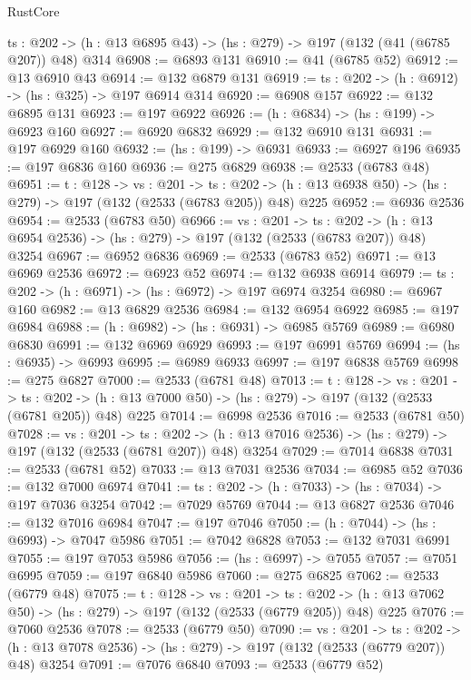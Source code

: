 \begin{lexlean}{RustCore}
\begin{coremodule}
  {ts : @202} -> (h : @13 @6895 @43) -> (hs : @279) -> @197 (@132 (@41 (@6785 @207)) @48) @314
@6908 := @6893 @131
@6910 := @41 (@6785 @52)
@6912 := @13 @6910 @43
@6914 := @132 @6879 @131
@6919 := {ts : @202} -> (h : @6912) -> (hs : @325) -> @197 @6914 @314
@6920 := @6908 @157
@6922 := @132 @6895 @131
@6923 := @197 @6922
@6926 := (h : @6834) -> (hs : @199) -> @6923 @160
@6927 := @6920 @6832
@6929 := @132 @6910 @131
@6931 := @197 @6929 @160
@6932 := (hs : @199) -> @6931
@6933 := @6927 @196
@6935 := @197 @6836 @160
@6936 := @275 @6829
@6938 := @2533 (@6783 @48)
@6951 := {t : @128} ->
  {vs : @201} ->
  {ts : @202} -> (h : @13 @6938 @50) -> (hs : @279) -> @197 (@132 (@2533 (@6783 @205)) @48) @225
@6952 := @6936 @2536
@6954 := @2533 (@6783 @50)
@6966 := {vs : @201} ->
  {ts : @202} -> (h : @13 @6954 @2536) -> (hs : @279) -> @197 (@132 (@2533 (@6783 @207)) @48) @3254
@6967 := @6952 @6836
@6969 := @2533 (@6783 @52)
@6971 := @13 @6969 @2536
@6972 := @6923 @52
@6974 := @132 @6938 @6914
@6979 := {ts : @202} -> (h : @6971) -> (hs : @6972) -> @197 @6974 @3254
@6980 := @6967 @160
@6982 := @13 @6829 @2536
@6984 := @132 @6954 @6922
@6985 := @197 @6984
@6988 := (h : @6982) -> (hs : @6931) -> @6985 @5769
@6989 := @6980 @6830
@6991 := @132 @6969 @6929
@6993 := @197 @6991 @5769
@6994 := (hs : @6935) -> @6993
@6995 := @6989 @6933
@6997 := @197 @6838 @5769
@6998 := @275 @6827
@7000 := @2533 (@6781 @48)
@7013 := {t : @128} ->
  {vs : @201} ->
  {ts : @202} -> (h : @13 @7000 @50) -> (hs : @279) -> @197 (@132 (@2533 (@6781 @205)) @48) @225
@7014 := @6998 @2536
@7016 := @2533 (@6781 @50)
@7028 := {vs : @201} ->
  {ts : @202} -> (h : @13 @7016 @2536) -> (hs : @279) -> @197 (@132 (@2533 (@6781 @207)) @48) @3254
@7029 := @7014 @6838
@7031 := @2533 (@6781 @52)
@7033 := @13 @7031 @2536
@7034 := @6985 @52
@7036 := @132 @7000 @6974
@7041 := {ts : @202} -> (h : @7033) -> (hs : @7034) -> @197 @7036 @3254
@7042 := @7029 @5769
@7044 := @13 @6827 @2536
@7046 := @132 @7016 @6984
@7047 := @197 @7046
@7050 := (h : @7044) -> (hs : @6993) -> @7047 @5986
@7051 := @7042 @6828
@7053 := @132 @7031 @6991
@7055 := @197 @7053 @5986
@7056 := (hs : @6997) -> @7055
@7057 := @7051 @6995
@7059 := @197 @6840 @5986
@7060 := @275 @6825
@7062 := @2533 (@6779 @48)
@7075 := {t : @128} ->
  {vs : @201} ->
  {ts : @202} -> (h : @13 @7062 @50) -> (hs : @279) -> @197 (@132 (@2533 (@6779 @205)) @48) @225
@7076 := @7060 @2536
@7078 := @2533 (@6779 @50)
@7090 := {vs : @201} ->
  {ts : @202} -> (h : @13 @7078 @2536) -> (hs : @279) -> @197 (@132 (@2533 (@6779 @207)) @48) @3254
@7091 := @7076 @6840
@7093 := @2533 (@6779 @52)

\end{coremodule}
\end{lexlean}
